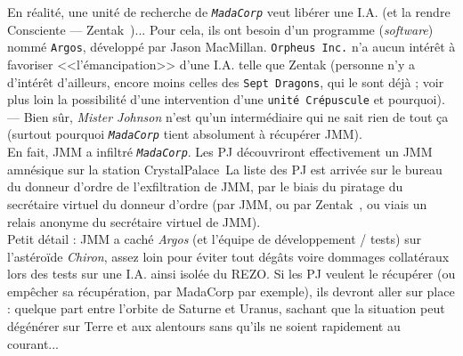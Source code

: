 \documentclass[11pt,twoside,a4paper]{article}
\begin{document}
En r{\'e}alit{\'e}, une unit{\'e} de recherche de \texttt{\emph{MadaCorp}}  veut lib{\'e}rer une I.A. (et la rendre Consciente --- Zentak~\texttrademark)... Pour cela, ils ont besoin d'un programme (\emph{software}) nomm{\'e} \texttt{Argos}, d{\'e}velopp{\'e} par Jason MacMillan. \texttt{Orpheus Inc.} n'a aucun int{\'e}r{\^e}t {\`a} favoriser <<l'{\'e}mancipation>> d'une I.A. telle que Zentak (personne n'y a d'int{\'e}r{\^e}t d'ailleurs, encore moins celles des \texttt{Sept Dragons}, qui le sont d{\'e}j{\`a} ; voir plus loin la possibilit{\'e} d'une intervention d'une \texttt{unit{\'e} Cr{\'e}puscule} et pourquoi). --- Bien s{\^u}r, \emph{Mister Johnson} n'est qu'un interm{\'e}diaire qui ne sait rien de tout \c{c}a (surtout pourquoi \texttt{\emph{MadaCorp}} tient absolument {\`a} r{\'e}cup{\'e}rer JMM). ~\\

En fait, JMM a infiltr{\'e} \texttt{\emph{MadaCorp}}. Les PJ d{\'e}couvriront effectivement un JMM amn{\'e}sique sur la station CrystalPalace~ La liste des PJ est arriv{\'e}e sur le bureau du donneur d'ordre de l'exfiltration de JMM, par le biais du piratage du secr{\'e}taire virtuel du donneur d'ordre (par JMM, ou par Zentak~\texttrademark, ou viais un relais anonyme du secr{\'e}taire virtuel de JMM). ~\\ 

Petit d{\'e}tail : JMM a cach{\'e} \emph{Argos} (et l'{\'e}quipe de d{\'e}veloppement / tests) sur l'ast{\'e}ro{\"i}de \emph{Chiron}, assez loin pour {\'e}viter tout d{\'e}g{\^a}ts voire dommages collat{\'e}raux lors des tests sur une I.A. ainsi isol{\'e}e du REZO. Si les PJ veulent le r{\'e}cup{\'e}rer (ou emp{\^e}cher sa r{\'e}cup{\'e}ration, par MadaCorp par exemple), ils devront aller sur place : quelque part entre l'orbite de Saturne et Uranus, sachant que la situation peut d{\'e}g{\'e}n{\'e}rer sur Terre et aux alentours sans qu'ils ne soient rapidement au courant...~\\
\end{document}
